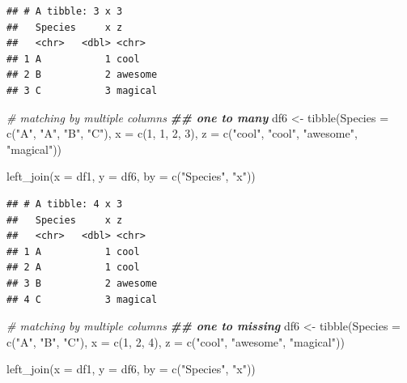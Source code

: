 \documentclass[
]{book}
\newenvironment{Shaded}{\begin{snugshade}}{\end{snugshade}}
\newcommand{\AttributeTok}[1]{\textcolor[rgb]{0.77,0.63,0.00}{#1}}
\newcommand{\CommentTok}[1]{\textcolor[rgb]{0.56,0.35,0.01}{\textit{#1}}}
\newcommand{\DecValTok}[1]{\textcolor[rgb]{0.00,0.00,0.81}{#1}}
\newcommand{\DocumentationTok}[1]{\textcolor[rgb]{0.56,0.35,0.01}{\textbf{\textit{#1}}}}
\newcommand{\FunctionTok}[1]{\textcolor[rgb]{0.00,0.00,0.00}{#1}}
\newcommand{\NormalTok}[1]{#1}
\newcommand{\OtherTok}[1]{\textcolor[rgb]{0.56,0.35,0.01}{#1}}
\newcommand{\StringTok}[1]{\textcolor[rgb]{0.31,0.60,0.02}{#1}}
\begin{document}
\begin{verbatim}
## # A tibble: 3 x 3
##   Species     x z      
##   <chr>   <dbl> <chr>  
## 1 A           1 cool   
## 2 B           2 awesome
## 3 C           3 magical
\end{verbatim}

\begin{Shaded}
\begin{Highlighting}[]
\CommentTok{\# matching by multiple columns}
\DocumentationTok{\#\# one to many}
\NormalTok{df6 }\OtherTok{\textless{}{-}} \FunctionTok{tibble}\NormalTok{(}\AttributeTok{Species =} \FunctionTok{c}\NormalTok{(}\StringTok{"A"}\NormalTok{, }\StringTok{"A"}\NormalTok{, }\StringTok{"B"}\NormalTok{, }\StringTok{"C"}\NormalTok{),}
              \AttributeTok{x =} \FunctionTok{c}\NormalTok{(}\DecValTok{1}\NormalTok{, }\DecValTok{1}\NormalTok{, }\DecValTok{2}\NormalTok{, }\DecValTok{3}\NormalTok{),}
              \AttributeTok{z =} \FunctionTok{c}\NormalTok{(}\StringTok{"cool"}\NormalTok{, }\StringTok{"cool"}\NormalTok{, }\StringTok{"awesome"}\NormalTok{, }\StringTok{"magical"}\NormalTok{))}

\FunctionTok{left\_join}\NormalTok{(}\AttributeTok{x =}\NormalTok{ df1,}
          \AttributeTok{y =}\NormalTok{ df6,}
          \AttributeTok{by =} \FunctionTok{c}\NormalTok{(}\StringTok{"Species"}\NormalTok{, }\StringTok{"x"}\NormalTok{))}
\end{Highlighting}
\end{Shaded}

\begin{verbatim}
## # A tibble: 4 x 3
##   Species     x z      
##   <chr>   <dbl> <chr>  
## 1 A           1 cool   
## 2 A           1 cool   
## 3 B           2 awesome
## 4 C           3 magical
\end{verbatim}

\begin{Shaded}
\begin{Highlighting}[]
\CommentTok{\# matching by multiple columns}
\DocumentationTok{\#\# one to missing}
\NormalTok{df6 }\OtherTok{\textless{}{-}} \FunctionTok{tibble}\NormalTok{(}\AttributeTok{Species =} \FunctionTok{c}\NormalTok{(}\StringTok{"A"}\NormalTok{, }\StringTok{"B"}\NormalTok{, }\StringTok{"C"}\NormalTok{),}
              \AttributeTok{x =} \FunctionTok{c}\NormalTok{(}\DecValTok{1}\NormalTok{, }\DecValTok{2}\NormalTok{, }\DecValTok{4}\NormalTok{),}
              \AttributeTok{z =} \FunctionTok{c}\NormalTok{(}\StringTok{"cool"}\NormalTok{, }\StringTok{"awesome"}\NormalTok{, }\StringTok{"magical"}\NormalTok{))}

\FunctionTok{left\_join}\NormalTok{(}\AttributeTok{x =}\NormalTok{ df1,}
          \AttributeTok{y =}\NormalTok{ df6,}
          \AttributeTok{by =} \FunctionTok{c}\NormalTok{(}\StringTok{"Species"}\NormalTok{, }\StringTok{"x"}\NormalTok{))}
\end{Highlighting}
\end{Shaded}
\end{document}
